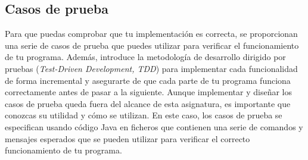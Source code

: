 \documentclass[
    a4paper, %
    12pt, %
]{CSSullivanBusinessReport}
\begin{document}
\subsection{Casos de prueba}\label{sec:casos-prueba}

Para que puedas comprobar que tu implementación es correcta, se proporcionan una serie de casos de prueba que puedes utilizar para verificar el funcionamiento de tu programa. Además, introduce la metodología de desarrollo dirigido por pruebas (\textit{Test-Driven Development, TDD}) para implementar cada funcionalidad de forma incremental y asegurarte de que cada parte de tu programa funciona correctamente antes de pasar a la siguiente. Aunque implementar y diseñar los casos de prueba queda fuera del alcance de esta asignatura, es importante que conozcas su utilidad y cómo se utilizan. En este caso, los casos de prueba se especifican usando código Java en ficheros que contienen una serie de comandos y mensajes esperados que se pueden utilizar para verificar el correcto funcionamiento de tu programa.
\end{document}
